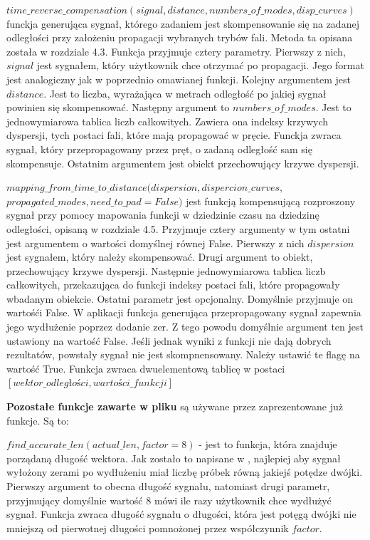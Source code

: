 $time\_reverse\_compensation(signal, distance, numbers\_of\_modes, disp\_curves)$ funckja generująca sygnał, którego zadaniem jest skompensowanie się na zadanej odległości przy założeniu propagacji wybranych trybów fali. Metoda ta opisana została w rozdziale 4.3. Funkcja przyjmuje cztery parametry. Pierwszy z nich, $signal$ jest sygnałem, który użytkownik chce otrzymać po propagacji. Jego format jest analogiczny jak w poprzednio omawianej funkcji. Kolejny argumentem jest $distance$. Jest to liczba, wyrażająca w metrach odległość po jakiej sygnał powinien się skompensować. Następny argument to $numbers\_of\_modes$. Jest to jednowymiarowa tablica liczb całkowitych. Zawiera ona indeksy krzywych dyspersji, tych postaci fali, które mają propagować w pręcie. Funckja zwraca sygnał, który przepropagowany przez pręt, o zadaną odległość sam się skompensuje. Ostatnim argumentem jest obiekt przechowujący krzywe dyspersji.

$mapping\_from\_time\_to\_distance(dispersion, dispercion\_curves,$
$ propagated\_modes, need\_to\_pad = False)$ jest funkcją kompensującą rozproszony sygnał przy pomocy mapowania funkcji w dziedzinie czasu na dziedzinę odległości, opisaną w rozdziale 4.5. Przyjmuje cztery argumenty w tym ostatni jest argumentem o wartości domyślnej równej False. Pierwszy z nich $dispersion$ jest sygnałem, który należy skompensować. Drugi argument to obiekt, przechowujący krzywe dyspersji. Następnie jednowymiarowa tablica liczb całkowitych, przekazująca do funkcji indeksy postaci fali, które propagowały  wbadanym obiekcie. Ostatni parametr jest opcjonalny. Domyślnie przyjmuje on wartośći False. W aplikacji funkcja generująca przepropagowany sygnał zapewnia jego wydłużenie poprzez dodanie zer. Z tego powodu domyślnie argument ten jest ustawiony na wartość False. Jeśli jednak wyniki z funkcji nie dają dobrych rezultatów, powstały sygnał nie jest skompnensowany. Należy ustawić te flagę na wartość True. Funkcja zwraca dwuelementową tablicę w postaci $[wektor\_odległości, wartości\_funkcji]$

\textbf{Pozostałe funkcje zawarte w pliku} są używane przez zaprezentowane już funkcje. Są to:

$find\_accurate\_len(actual\_len, factor=8)$ - jest to funkcja, która znajduje porządaną długość wektora. Jak zostało to napisane w \cite{kasia1}, najlepiej aby sygnał wyłożony zerami po wydłużeniu miał liczbę próbek równą jakiejś potędze dwójki. Pierwszy argument to obecna długość sygnału, natomiast drugi parametr, przyjmujący domyślnie wartość 8 mówi ile razy użytkownik chce wydłużyć sygnał. Funkcja zwraca długość sygnału o długości, która jest potęgą dwójki nie mniejszą od pierwotnej długości pomnożonej przez współczynnik $factor$.

